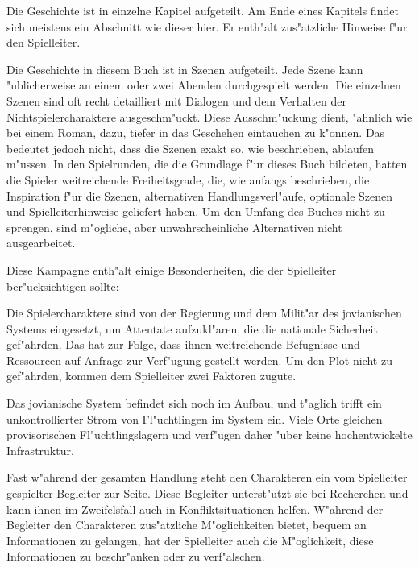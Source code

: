 \begin{remarks}
    Die Geschichte ist in einzelne Kapitel aufgeteilt. Am Ende eines Kapitels findet sich meistens ein Abschnitt wie dieser hier. Er enth"alt zus"atzliche Hinweise f"ur den Spielleiter.
\end{remarks}


Die Geschichte in diesem Buch ist in Szenen aufgeteilt. Jede Szene kann "ublicherweise an einem oder zwei Abenden durchgespielt werden. Die einzelnen Szenen sind oft recht detailliert mit Dialogen und dem Verhalten der Nichtspielercharaktere ausgeschm"uckt. Diese Ausschm"uckung dient, "ahnlich wie bei einem Roman, dazu, tiefer in das Geschehen eintauchen zu k"onnen. Das bedeutet jedoch nicht, dass die Szenen exakt so, wie beschrieben, ablaufen m"ussen. In den Spielrunden, die die Grundlage f"ur dieses Buch bildeten, hatten die Spieler weitreichende Freiheitsgrade, die, wie anfangs beschrieben, die Inspiration f"ur die Szenen, alternativen Handlungsverl"aufe, optionale Szenen und Spielleiterhinweise geliefert haben. Um den Umfang des Buches nicht zu sprengen, sind m"ogliche, aber unwahrscheinliche Alternativen nicht ausgearbeitet.

Diese Kampagne enth"alt einige Besonderheiten, die der Spielleiter ber"ucksichtigen sollte:

Die Spielercharaktere sind von der Regierung und dem Milit"ar des jovianischen Systems eingesetzt, um Attentate aufzukl"aren, die die nationale Sicherheit gef"ahrden. Das hat zur Folge, dass ihnen weitreichende Befugnisse und Ressourcen auf Anfrage zur Verf"ugung gestellt werden. Um den Plot nicht zu gef"ahrden, kommen dem Spielleiter zwei Faktoren zugute. 

Das jovianische System befindet sich noch im Aufbau, und t"aglich trifft ein unkontrollierter Strom von Fl"uchtlingen im System ein. Viele Orte gleichen provisorischen Fl"uchtlingslagern und verf"ugen daher "uber keine hochentwickelte Infrastruktur.

Fast w"ahrend der gesamten Handlung steht den Charakteren ein vom Spielleiter gespielter Begleiter zur Seite. Diese Begleiter unterst"utzt sie bei Recherchen und kann ihnen im Zweifelsfall auch in Konfliktsituationen helfen. W"ahrend der Begleiter den Charakteren zus"atzliche M"oglichkeiten bietet, bequem an Informationen zu gelangen, hat der Spielleiter auch die M"oglichkeit, diese Informationen zu beschr"anken oder zu verf"alschen.
%
%
